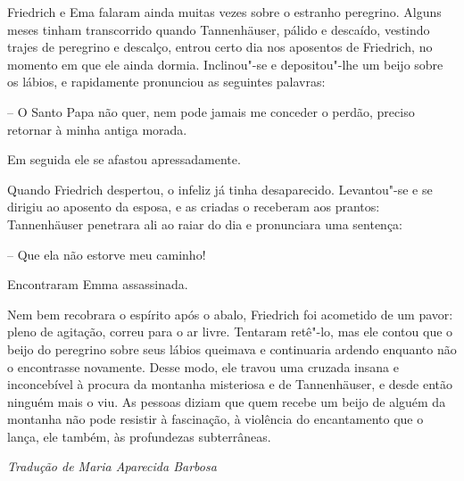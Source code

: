 Friedrich e Ema falaram ainda muitas vezes sobre o estranho peregrino. 
Alguns meses tinham transcorrido quando Tannenhäuser,
pálido e descaído, vestindo trajes de peregrino e descalço, entrou certo
dia nos aposentos de Friedrich, no momento em que ele ainda dormia.
Inclinou"-se e depositou"-lhe um beijo sobre os lábios, e rapidamente
pronunciou as seguintes palavras:

-- O Santo Papa não quer, nem pode jamais me conceder o perdão, preciso
retornar à minha antiga morada.

Em seguida ele se afastou apressadamente.

Quando Friedrich despertou, o infeliz já tinha desaparecido. Levantou"-se
e se dirigiu ao aposento da \mbox{esposa}, e as criadas o receberam aos
prantos: \mbox{Tannenhäuser} penetrara ali ao raiar do dia e pronunciara uma
sentença:

-- Que ela não estorve meu caminho!

Encontraram Emma assassinada.

Nem bem recobrara o espírito após o abalo, Friedrich foi acometido de um
pavor: pleno de agitação, correu para o ar livre. Tentaram retê"-lo, mas
ele contou que o beijo do peregrino sobre seus lábios queimava e
continuaria ardendo enquanto não o encontrasse novamente. Desse modo,
ele travou uma cruzada insana e inconcebível à procura da montanha
misteriosa e de Tannenhäuser, e desde então ninguém mais o viu. As
pessoas diziam que quem recebe um beijo de alguém da montanha não pode
resistir à fascinação, à violência do encantamento que o lança, ele
também, às profundezas subterrâneas.
\medskip

\hfill\textit{Tradução de Maria Aparecida Barbosa}

